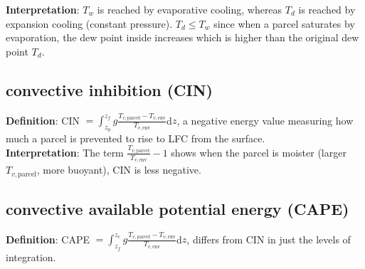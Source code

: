 {\bf Interpretation}: $T_w$ is reached by evaporative cooling, whereas $T_d$ is
reached by expansion cooling (constant pressure). $T_d \le T_w$ since when a parcel saturates by
evaporation, the dew point inside increases which is higher than the original dew point $T_d$.

\subsection{convective inhibition (CIN)}
{\bf Definition}: 
CIN $=\int_{z_0}^{z_f} g \frac{T_{v,\text{parcel}} - T_{v,\text{env}}}{T_{v,\text{env}}} $d$z$, 
a negative energy value measuring how much a parcel is prevented to rise to LFC from the surface. \\

{\bf Interpretation}: The term $\frac{T_{v,\text{parcel}}}{T_{v,\text{env}}} -
1$ shows when the parcel is moister (larger $T_{v,\text{parcel}}$, more buoyant), CIN is less negative.

\subsection{convective available potential energy (CAPE)}
{\bf Definition}: 
CAPE $=\int_{z_f}^{z_e} g \frac{T_{v,\text{parcel}} - T_{v,\text{env}}}{T_{v,\text{env}}} $d$z$,
differs from CIN in just the levels of integration.



